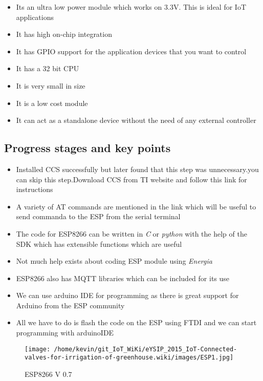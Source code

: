 \documentclass[16pt]{article}
\begin{document}
\begin{itemize}

\item
  Its an ultra low power module which works on 3.3V. This is ideal for
  IoT applications
\item
  It has high on-chip integration
\item
  It has GPIO support for the application devices that you want to
  control
\item
  It has a 32 bit CPU
\item
  It is very small in size
\item
  It is a low cost module
\item
  It can act as a standalone device without the need of any external
  controller
\end{itemize}


\subsection{Progress stages and key points}

\begin{itemize}

\item
  Installed CCS successfully but later found that this step was unnecessary.you can skip this step.Download CCS from TI website and follow this link for instructions
\item
  A variety of AT commands are mentioned in the link which will be
  useful to send commanda to the ESP from the serial terminal
\item
  The code for ESP8266 can be written in \emph{C} or \emph{python} with
  the help of the SDK which has extensible functions which are useful
\item
  Not much help exists about coding ESP module using \emph{Energia}  
\item
  ESP8266 also has MQTT libraries which can be included for its use
\item
  We can use arduino IDE for programming as there is great support for
  Arduino from the ESP community
\item
  All we have to do is flash the code on the ESP using FTDI and we can
  start programming with arduinoIDE
  
\end{itemize}

  \begin{figure}
\hspace{3cm}
\texttt{[image: /home/kevin/git\_IoT\_WiKi/eYSIP\_2015\_IoT-Connected-valves-for-irrigation-of-greenhouse.wiki/images/ESP1.jpg]}
\caption{ESP8266 V 0.7}
\end{figure}
\vspace{0.4cm}
\end{document}
